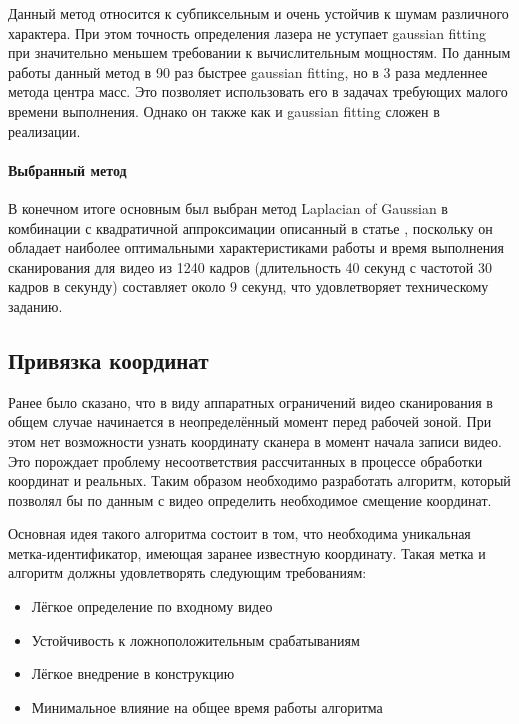                 Данный метод относится к субпиксельным и очень устойчив к шумам различного характера. При этом точность определения лазера не уступает gaussian fitting при значительно меньшем требовании к вычислительным мощностям. По данным работы \cite{Li2017} данный метод в 90 раз быстрее gaussian fitting, но в 3 раза медленнее метода центра масс. Это позволяет использовать его в задачах требующих малого времени выполнения. Однако он также как и gaussian fitting сложен в реализации.
            
            \paragraph{Выбранный метод}
                В конечном итоге основным был выбран метод Laplacian of Gaussian в комбинации с квадратичной аппроксимации описанный в статье \cite{Molder2014}, поскольку он обладает наиболее оптимальными характеристиками работы и время выполнения сканирования для видео из 1240 кадров (длительность 40 секунд с частотой 30 кадров в секунду) составляет около 9 секунд, что удовлетворяет техническому заданию.
            
        \subsection{Привязка координат}
            Ранее было сказано, что в виду аппаратных ограничений видео сканирования в общем случае начинается в неопределённый момент перед рабочей зоной. При этом нет возможности узнать координату сканера в момент начала записи видео. Это порождает проблему несоответствия рассчитанных в процессе обработки координат и реальных. Таким образом необходимо разработать алгоритм, который позволял бы по данным с видео определить необходимое смещение координат.
            
            Основная идея такого алгоритма состоит в том, что необходима уникальная метка-идентификатор, имеющая заранее известную координату. Такая метка и алгоритм должны удовлетворять следующим требованиям:
            \begin{itemize}
                \item Лёгкое определение по входному видео
                \item Устойчивость к ложноположительным срабатываниям
                \item Лёгкое внедрение в конструкцию
                \item Минимальное влияние на общее время работы алгоритма
            \end{itemize}

